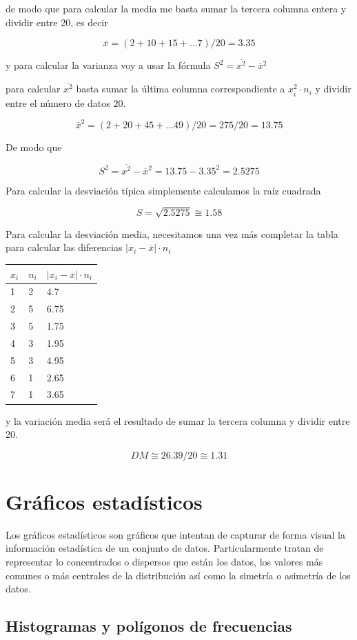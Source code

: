 \documentclass[
]{article}
\begin{document}
de modo que para calcular la media me basta sumar la tercera columna
entera y dividir entre 20, es decir

\[\overline x = (2+10+15+\ldots 7)/20 = 3.35\]

y para calcular la varianza voy a usar la fórmula
\(S^2 = \overline{x^2} - \overline x^2\)

para calcular \(\overline{x^2}\) basta sumar la última columna
correspondiente a \(x_i^2 \cdot n_i\) y dividir entre el número de datos
\(20\).

\[\overline x^2 = (2+20+45+\ldots 49)/20 = 275/20 = 13.75\]

De modo que

\[S^2 =\overline{x^2} - \overline x^2 = 13.75-3.35^2 = 2.5275\]

Para calcular la desviación típica simplemente calculamos la raíz
cuadrada

\[S= \sqrt{2.5275} \cong 1.58\]

Para calcular la desviación media, necesitamos una vez más completar la
tabla para calcular las diferencias \(|x_i - \overline x|\cdot n_i\)

\begin{longtable}[]{@{}lll@{}}
\toprule
\(x_i\) & \(n_i\) & \(|x_i - \overline x|\cdot n_i\)\tabularnewline
\midrule
\endhead
1 & 2 & 4.7\tabularnewline
2 & 5 & 6.75\tabularnewline
3 & 5 & 1.75\tabularnewline
4 & 3 & 1.95\tabularnewline
5 & 3 & 4.95\tabularnewline
6 & 1 & 2.65\tabularnewline
7 & 1 & 3.65\tabularnewline
\bottomrule
\end{longtable}

y la variación media será el resultado de sumar la tercera columna y
dividir entre 20.

\[DM \cong 26.39/20\cong 1.31\]

\hypertarget{gruxe1ficos-estaduxedsticos}{%
\section{Gráficos estadísticos}\label{gruxe1ficos-estaduxedsticos}}

Los gráficos estadísticos son gráficos que intentan de capturar de forma
visual la información estadística de un conjunto de datos.
Particularmente tratan de representar lo concentrados o dispersos que
están los datos, los valores más comunes o más centrales de la
distribución así como la simetría o asimetría de los datos.

\hypertarget{histogramas-y-poluxedgonos-de-frecuencias}{%
\subsection{Histogramas y polígonos de
frecuencias}\label{histogramas-y-poluxedgonos-de-frecuencias}}
\end{document}
